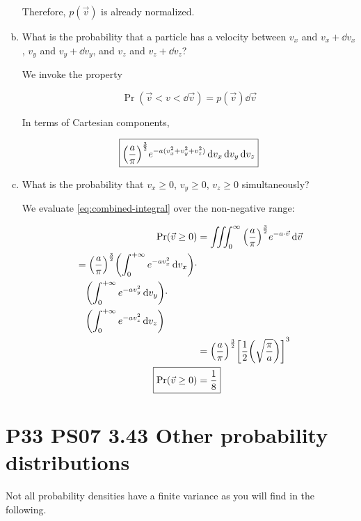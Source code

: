 \documentclass[9pt,a4paper,twocolumn]{article}
\begin{document}
\begin{enumerate}[(a)]
Therefore, $p(\vec{v})$ is already normalized.

\item What is the probability that a particle has a velocity between $v_x$ and $v_x+\dd{v_x}$, $v_y$ and $v_y+\dd{v_y}$,
and $v_z$ and $v_z + \dd{v_z}$?

We invoke the property

\begin{equation}
	\Pr(\vec{v} < v < \dd{\vec{v}}) = p(\vec{v})\dd{\vec{v}}
\end{equation}

In terms of Cartesian components,

\begin{equation}
	\boxed{
		\qty(\frac{a}{\pi})^{\frac{3}{2}}e^{-a(v_x^2 + v_y^2 + v_z^2)} \dd{v_x} \dd{v_y} \dd{v_z}
	}
\end{equation}

\item What is the probability that $v_x \geq 0$, $v_y \geq 0$, $v_z \geq 0$ simultaneously?

We evaluate \eqref{eq:combined-integral} over the non-negative range:

\begin{align}
	\Pr(\vec{v} \geq 0) &= \iiint_0^\infty \qty(\frac{a}{\pi})^{\frac{3}{2}} e^{-a\cdot\vec{v}}\dd{\vec{v}} \\
	\begin{split}
		&= \qty(\frac{a}{\pi})^{\frac{3}{2}}\qty(\int_0^{+\infty} e^{-av_x^2} \dd{v_x}) \cdot \\
		& \quad \qty(\int_0^{+\infty} e^{-av_y^2} \dd{v_y}) \cdot \\
		& \quad \qty(\int_0^{+\infty} e^{-av_z^2} \dd{v_z})
	\end{split} \nonumber \\
	&= \qty(\frac{a}{\pi})^{\frac{3}{2}}\qty[\frac{1}{2}\qty(\sqrt{\frac{\pi}{a}})]^3 \nonumber \\
	\Aboxed{
		\Pr(\vec{v} \geq 0) &= \frac{1}{8}
	} \label{eq:answer-c}
\end{align}

\end{enumerate}

\section{P33 PS07 3.43 Other probability distributions}
Not all probability densities have a finite variance as you will find in the following.
\end{document}
